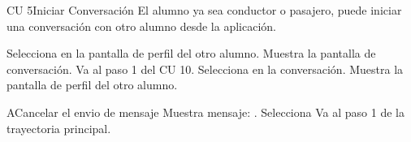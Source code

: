 \begin{UseCase} {CU 5}{Iniciar Conversación}{
	El alumno ya sea conductor o pasajero, puede iniciar una conversación con otro alumno desde la aplicación.
}




\end{UseCase}


\begin{UCtrayectoria}
	
	\UCpaso [\UCactor]	Selecciona  en la pantalla de perfil del otro alumno. 
	\UCpaso [\UCsist]Muestra la pantalla de conversación.
	\UCpaso Va al paso 1 del CU 10.
	\UCpaso [\UCactor]	Selecciona  en la conversación. 
	\UCpaso [\UCsist]Muestra la pantalla de perfil del otro alumno.
\end{UCtrayectoria}



\begin{UCtrayectoriaA}{A}{Cancelar el envio de mensaje}
	\UCpaso [\UCsist]Muestra mensaje: .
	\UCpaso [\UCactor]	Selecciona 
	\UCpaso Va al paso 1 de la trayectoria principal.
\end{UCtrayectoriaA}

